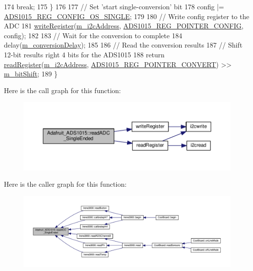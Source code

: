 \begin{DoxyCode}
174       \textcolor{keywordflow}{break};
175   \}
176 
177   \textcolor{comment}{// Set 'start single-conversion' bit}
178   config |= \hyperlink{_cool_adafruit___a_d_s1015_8h_a13f4550d061699b1cf4bd49520fc4a9c}{ADS1015\_REG\_CONFIG\_OS\_SINGLE};
179 
180   \textcolor{comment}{// Write config register to the ADC}
181   \hyperlink{_cool_adafruit___a_d_s1015_8cpp_a00ef55774dfb93dd0a7bf561d8451b71}{writeRegister}(\hyperlink{class_adafruit___a_d_s1015_a2186993621a7973256d47f086c74035d}{m\_i2cAddress}, 
      \hyperlink{_cool_adafruit___a_d_s1015_8h_ab9abb781632542a0e7d8b058292f26b1}{ADS1015\_REG\_POINTER\_CONFIG}, config);
182 
183   \textcolor{comment}{// Wait for the conversion to complete}
184   delay(\hyperlink{class_adafruit___a_d_s1015_aa3a29a64a6705fce1fee21d73c642a0e}{m\_conversionDelay});
185 
186   \textcolor{comment}{// Read the conversion results}
187   \textcolor{comment}{// Shift 12-bit results right 4 bits for the ADS1015}
188   \textcolor{keywordflow}{return} \hyperlink{_cool_adafruit___a_d_s1015_8cpp_a319539381b7551b2f83a92b0b596e97d}{readRegister}(\hyperlink{class_adafruit___a_d_s1015_a2186993621a7973256d47f086c74035d}{m\_i2cAddress}, 
      \hyperlink{_cool_adafruit___a_d_s1015_8h_a0f462c806b353bd682fa3c2d67e66622}{ADS1015\_REG\_POINTER\_CONVERT}) >> \hyperlink{class_adafruit___a_d_s1015_ab238ce17112a78db2be4ea14d57fb114}{m\_bitShift};  
189 \}
\end{DoxyCode}
Here is the call graph for this function\+:\nopagebreak
\begin{figure}[H]
\begin{center}
\leavevmode
\includegraphics[width=350pt]{df/df6/class_adafruit___a_d_s1015_a40f38b9e1f3ec397c0670dd632510235_cgraph}
\end{center}
\end{figure}
Here is the caller graph for this function\+:\nopagebreak
\begin{figure}[H]
\begin{center}
\leavevmode
\includegraphics[width=350pt]{df/df6/class_adafruit___a_d_s1015_a40f38b9e1f3ec397c0670dd632510235_icgraph}
\end{center}
\end{figure}
